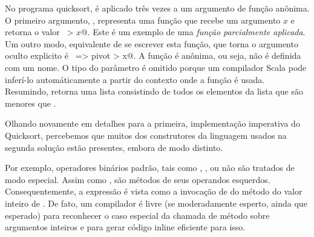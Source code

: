 No programa quicksort,  é aplicado três vezes a um argumento 
de função anônima. O primeiro argumento, , representa uma 
função que recebe um argumento $x$ e retorna o valor ~\lstinline@pivot > $x$@.
Este é um exemplo de uma {\em função parcialmente aplicada}. Um outro modo, 
equivalente de se escrever esta função, que torna o argumento oculto explicito
é ~\lstinline@x => pivot > x@. A função é anônima, ou seja, não é definida
com um nome. O tipo do parâmetro   é omitido porque um compilador Scala 
pode inferí-lo automáticamente a partir do contexto onde a função é usada.
Resumindo,  retorna uma lista consistindo de todos os 
elementos da lista  que são menores que .  

Olhando novamente em detalhes para a primeira, implementação imperativa
do Quicksort, percebemos que muitos dos construtores da linguagem 
usados na segunda solução estão presentes, embora de modo distinto.



Por exemplo, operadores binários padrão, tais como \code{+}, \code{-},
ou \code{<} não são tratados de modo especial. Assim como , 
são métodos de seus operandos esquerdos. Consequentemente, a expressão 
 é vista como a invocação de  do método \code{+}      
do valor inteiro de . De fato, um compilador é livre (se 
moderadamente esperto, ainda que  esperado) para reconhecer o caso 
especial da chamada de método \code{+} sobre argumentos inteiros e 
para gerar código inline eficiente para isso.  

